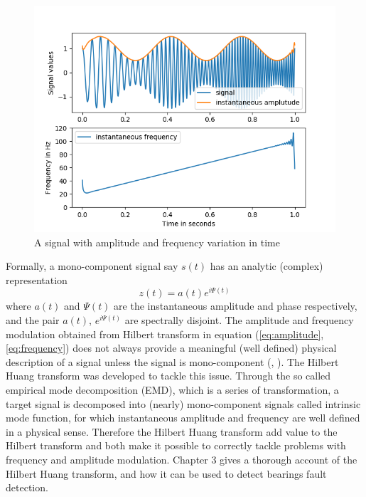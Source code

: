\documentclass[../Main/thesis.tex]{subfiles}
\begin{document}
\begin{figure}[H]
	\centering
	\includegraphics[width=1\linewidth]{../fig/inst}
	\caption{A signal with amplitude and frequency variation in time}
	\label{fig:inst}
\end{figure}
\justify

Formally, a mono-component signal say $s(t)$ has an analytic (complex) representation 
\begin{equation}
	z(t) = a(t)e^{i \Psi(t)} 
\end{equation}
where $a(t)$ and $\Psi(t)$ are the instantaneous amplitude and phase respectively,
and the pair $a(t)$, $e^{i \Psi(t)}$ are spectrally disjoint.
The amplitude and frequency modulation obtained from Hilbert transform in equation (\ref{eq:amplitude}, \ref{eq:frequency}) does not always provide a meaningful (well defined) physical description of a signal unless the signal is mono-component (\cite{huang98}, \cite{huang08}). The Hilbert Huang transform was developed to tackle this issue. Through the so called empirical mode decomposition (EMD), which is a series of transformation, a target signal is decomposed into (nearly) mono-component signals called intrinsic mode function, for which instantaneous amplitude and frequency are well defined in a physical sense. Therefore the Hilbert Huang transform add value to the Hilbert transform and both make it possible to correctly tackle problems with frequency and amplitude modulation. Chapter 3 gives a thorough account of the Hilbert Huang transform, and how it can be used to detect bearings fault detection. 
\justify
  
\end{document}
